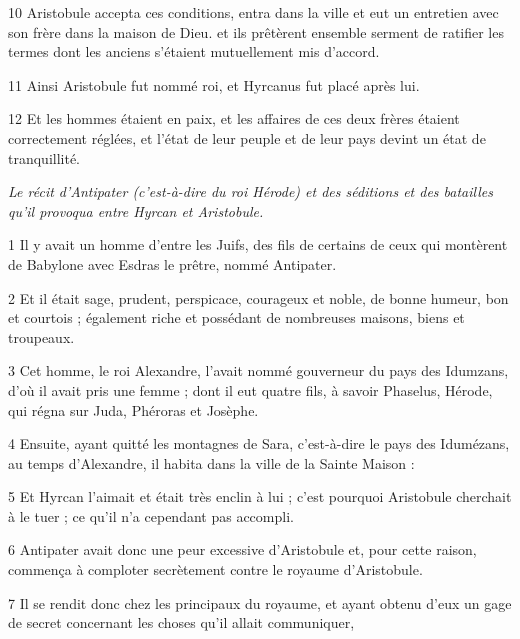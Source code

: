 \par 10 Aristobule accepta ces conditions, entra dans la ville et eut un entretien avec son frère dans la maison de Dieu. et ils prêtèrent ensemble serment de ratifier les termes dont les anciens s'étaient mutuellement mis d'accord.

\par 11 Ainsi Aristobule fut nommé roi, et Hyrcanus fut placé après lui.

\par 12 Et les hommes étaient en paix, et les affaires de ces deux frères étaient correctement réglées, et l'état de leur peuple et de leur pays devint un état de tranquillité.


\par \textit{Le récit d'Antipater (c'est-à-dire du roi Hérode) et des séditions et des batailles qu'il provoqua entre Hyrcan et Aristobule.}

\par 1 Il y avait un homme d'entre les Juifs, des fils de certains de ceux qui montèrent de Babylone avec Esdras le prêtre, nommé Antipater.

\par 2 Et il était sage, prudent, perspicace, courageux et noble, de bonne humeur, bon et courtois ; également riche et possédant de nombreuses maisons, biens et troupeaux.

\par 3 Cet homme, le roi Alexandre, l'avait nommé gouverneur du pays des Idumzans, d'où il avait pris une femme ; dont il eut quatre fils, à savoir Phaselus, Hérode, qui régna sur Juda, Phéroras et Josèphe.

\par 4 Ensuite, ayant quitté les montagnes de Sara, c'est-à-dire le pays des Idumézans, au temps d'Alexandre, il habita dans la ville de la Sainte Maison :

\par 5 Et Hyrcan l'aimait et était très enclin à lui ; c'est pourquoi Aristobule cherchait à le tuer ; ce qu’il n’a cependant pas accompli.

\par 6 Antipater avait donc une peur excessive d'Aristobule et, pour cette raison, commença à comploter secrètement contre le royaume d'Aristobule.

\par 7 Il se rendit donc chez les principaux du royaume, et ayant obtenu d'eux un gage de secret concernant les choses qu'il allait communiquer,

